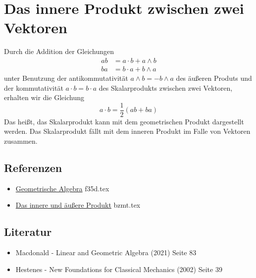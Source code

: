 \documentclass{sajzk}
\begin{document}
\section{Das innere Produkt zwischen zwei Vektoren}
\label{1l7s}

Durch die Addition der Gleichungen
\begin{align*}
  ab &= a\cdot b + a\wedge b \\ 
  ba &= b\cdot a + b\wedge a
\end{align*}
unter Benutzung der antikommutativität $a\wedge b = -b\wedge a$ des äußeren
Produts und der kommutativität $a\cdot b = b\cdot a$ des Skalarprodukts
zwischen zwei Vektoren, erhalten wir die
Gleichung
$$ a\cdot b = \frac{1}{2}(ab+ba)$$
Das heißt, das Skalarprodukt kann mit dem geometrischen Produkt dargestellt
werden. Das Skalarprodukt fällt mit dem inneren Produkt im Falle von Vektoren
zusammen.

\subsection{Referenzen} 
\begin{itemize}
    \item \href{f35d.pdf}{Geometrische Algebra} f35d.tex
    \item \href{bzmt.pdf}{Das innere und äußere Produkt} bzmt.tex
\end{itemize}

\subsection{Literatur} 
\begin{itemize}
    \item Macdonald - Linear and Geometric Algebra (2021) Seite 83
    \item Hestenes - New Foundations for Classical Mechanics (2002) Seite 39
\end{itemize}
\end{document}
